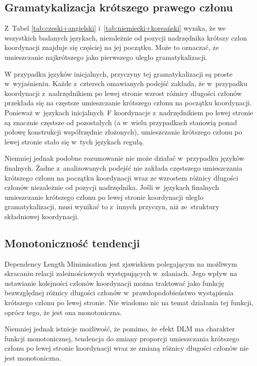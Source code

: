 \subsection{Gramatykalizacja krótszego prawego członu} \label{gramatykalizacja}

Z~Tabel \ref{tab:czeski+angielski} i~\ref{tab:niemiecki+koreański} wynika, że we wszystkich badanych językach, niezależnie od pozycji nadrzędnika krótszy człon koordynacji znajduje się częściej na jej początku. Może to oznaczać, że umieszczanie najkrótszego jako pierwszego uległo gramatykalizacji.

W przypadku języków inicjalnych, przyczyny tej gramatykalizacji są proste w~wyjaśnieniu. Każde z~czterech omawianych podejść zakłada, że w~przypadku  koordynacji z~nadrzędnikiem po lewej stronie wzrost różnicy długości członów przekłada się na częstsze umieszczanie krótszego członu na początku koordynacji. Ponieważ w~językach inicjalnych~F koordynacje z~nadrzędnikiem po lewej stronie są znacznie częstsze od pozostałych (a w~wielu przypadkach stanowią ponad połowę konstrukcji współrzędnie złożonych), umieszczanie krótszego członu po lewej stronie stało się w~tych językach regułą. 

Niemniej jednak podobne rozumowanie nie może działać w~przypadku języków finalnych. Żadne z~analizowanych podejść nie zakłada częstszego umieszczania krótszego członu na początku koordynacji wraz ze wzrostem różnicy długości członów niezależnie od pozycji nadrzędnika. Jeśli w~językach finalnych umieszczanie krótszego członu po lewej stronie koordynacji uległo gramatykalizacji, musi wynikać to z~innych przyczyn, niż ze~struktury składniowej koordynacji. 

\subsection{Monotoniczność tendencji}

Dependency Length Minimisation jest zjawiskiem polegającym na możliwym skracaniu relacji zależnościowych występujących w~zdaniach. Jego wpływ na ustawianie kolejności członów koordynacji można traktować jako funkcję bezwzględnej różnicy długości członów w~prawdopodobieństwo wystąpienia krótszego członu po lewej stronie. Nie wiadomo nic na temat działania tej funkcji, oprócz tego, że jest ona monotoniczna.

Niemniej jednak istnieje możliwość, że pomimo, że efekt DLM ma charakter funkcji monotonicznej, tendencja do zmiany proporcji umieszczania krótszego członu po lewej stronie koordynacji wraz ze zmianą różnicy długości członów nie jest monotoniczna. 

